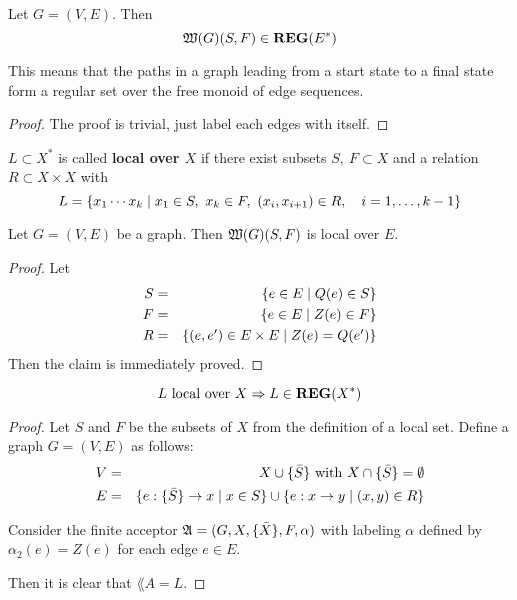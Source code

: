 \bigskip
\begin{lemma}
Let $G = (V, E)$. Then \[ \mbox{$\mathfrak{W}(G)$}(S,F) \in \mbox{{\bf REG}}(E^*) \]
\end{lemma}
This means that the paths in a graph leading from a start state to a final state
form a regular set over the free monoid of edge sequences. 
\begin{proof}
The proof is trivial, just label each edges with itself.
\end{proof}

\bigskip
\begin{definition}
$L \subset X^*$ is called {\bf local over $X$} if there exist subsets $S,\ F
\subset X$ and a relation $R \subset X \times X$ with 
\[ L = \mbox{$\{x_1 \cdots x_k \mid x_1 \in S,\ x_k \in F,\ (x_i, x_{i+1}) \in R,
\quad i = 1, \ldots, k - 1\}$} \]
\end{definition}

\bigskip
\begin{lemma}
Let $G = (V, E)$ be a graph. Then $\mbox{$\mathfrak{W}(G)$}(S, F)$ is local over $E$.
\end{lemma}

\begin{proof}
Let \begin{eqnarray*}
S & = & \mbox{$\{e \in E \mid Q(e) \in S\}$} \\ 
F & = & \mbox{$\{e \in E \mid Z(e) \in F\}$} \\
R & = & \mbox{$\{(e, e') \in E \times E \mid Z(e) = Q(e')\}$} 
\end{eqnarray*}
Then the claim is immediately proved.
\end{proof}

\bigskip
\begin{lemma}
\[ L \mbox{ local over } X \Rightarrow L \in \mbox{{\bf REG}}(X^*) \]
\end{lemma}

\begin{proof}
Let $S$ and $F$ be the subsets of $X$ from the definition of a local
set. Define a graph $G = (V, E)$ as follows:
\begin{eqnarray*}
V & = & X \cup \mbox{$\{\bar{S}\}$} \mbox{ with } X \cap \mbox{$\{\bar{S}\}$} = \emptyset
\\
E & = & \mbox{$\{e : \mbox{$\{\bar{S}\}$} \to x \mid x \in S\}$} \cup \mbox{$\{e : x \to y
\mid (x, y) \in R\}$}
\end{eqnarray*}

Consider the finite acceptor $\mbox{$\mathfrak{A}$} = (G, X, \mbox{$\{\bar{X}\}$}, F, \alpha)$ with
labeling $\alpha$ defined by $\alpha_2(e) = Z(e)$ for each edge $e \in E$.

Then it is clear that $\lang{A} = L$.
\end{proof}

